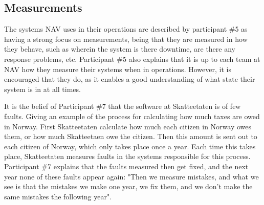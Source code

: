 \subsection{Measurements} \label{sec:measurements}
The systems NAV uses in their operations are described by participant \#5 as having a strong focus on measurements, being that they are measured in how they behave, such as wherein the system is there downtime, are there any response problems, etc. Participant \#5 also explains that it is up to each team at NAV how they measure their systems when in operations. However, it is encouraged that they do, as it enables a good understanding of what state their system is in at all times.


It is the belief of Participant \#7 that the software at Skatteetaten is of few faults. Giving an example of the process for calculating how much taxes are owed in Norway. First Skatteetaten calculate how much each citizen in Norway owes them, or how much Skatteetaen owe the citizen. Then this amount is sent out to each citizen of Norway, which only takes place once a year. Each time this takes place, Skatteetaten measures faults in the systems responsible for this process. Participant \#7 explains that the faults measured then get fixed, and the next year none of these faults appear again: "Then we measure mistakes, and what we see is that the mistakes we make one year, we fix them, and we don't make the same mistakes the following year".


